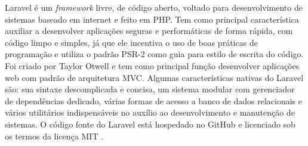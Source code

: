 
Laravel é um \textit{framework} livre, de código aberto, voltado para desenvolvimento de sistemas baseado em internet e feito em PHP. Tem como principal característica auxiliar a desenvolver aplicações seguras e performáticas de forma rápida, com código limpo e simples, já que ele incentiva o uso de boas práticas de programação e utiliza o padrão PSR-2 como guia para estilo de escrita do código. Foi criado por Taylor Otwell e tem como principal função desenvolver aplicações web com padrão de arquitetura MVC. Algumas características nativas do Laravel são: sua sintaxe descomplicada e concisa, um sistema modular com gerenciador de dependências dedicado, várias formas de acesso a banco de dados relacionais e vários utilitários indispensáveis no auxílio ao desenvolvimento e manutenção de sistemas. O código fonte do Laravel está hospedado no GitHub e licenciado sob os termos da licença MIT \cite{portalgsti:laravel}. 


